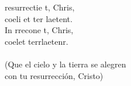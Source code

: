 \begin{cancion}%
	 resurrectie t, Chris,\\
	coeli et ter laetent.\\
	In rrecone t, Chris,\\
	coelet terrlaetenr.\\
	\jump\\
(Que el cielo y la tierra se alegren\\
 con tu resurrección, Cristo)\\
\end{cancion}%
